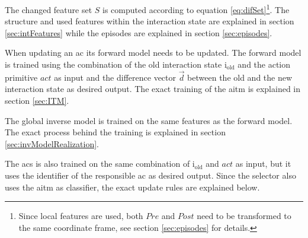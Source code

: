 
The changed feature set $S$ is computed according to equation \ref{eq:difSet}\footnote{Since local features are used, both $Pre$ and $Post$ need to be transformed to the same coordinate frame, see section \ref{sec:episodes} for details.}. The structure and used features within the interaction state are explained in section \ref{sec:intFeatures} while the episodes are explained in section \ref{sec:episodes}.

When updating an \gls{ac} its forward model needs to be updated. The forward model is trained using the combination of the old interaction state  i$_\text{old}$ and the action primitive $act$ as input and the difference vector $\vec{d}$ between the old and the new interaction state as desired output. The exact training of the \gls{aitm} is explained in section \ref{sec:ITM}. 

The global inverse model is trained on the same features as the forward model. The exact process behind the training is explained in section \ref{sec:invModelRealization}.

The \gls{acs} is also trained on the same combination of i$_\text{old}$ and $act$ as input, but it uses the identifier of the responsible \gls{ac} as desired output.
Since the selector also uses the \gls{aitm} as classifier, the exact update rules are explained below.

